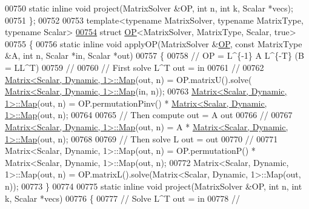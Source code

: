 \begin{DoxyCode}
00750     \textcolor{keyword}{static} \textcolor{keyword}{inline} \textcolor{keywordtype}{void} project(MatrixSolver &OP, \textcolor{keywordtype}{int} n, \textcolor{keywordtype}{int} k, Scalar *vecs);
00751 \};
00752 
00753 \textcolor{keyword}{template}<\textcolor{keyword}{typename} MatrixSolver, \textcolor{keyword}{typename} MatrixType, \textcolor{keyword}{typename} Scalar>
\hyperlink{struct_eigen_1_1internal_1_1_o_p_3_01_matrix_solver_00_01_matrix_type_00_01_scalar_00_01true_01_4}{00754} \textcolor{keyword}{struct }\hyperlink{struct_eigen_1_1internal_1_1_o_p}{OP}<MatrixSolver, MatrixType, Scalar, true>
00755 \{
00756   \textcolor{keyword}{static} \textcolor{keyword}{inline} \textcolor{keywordtype}{void} applyOP(MatrixSolver &\hyperlink{struct_eigen_1_1internal_1_1_o_p}{OP}, \textcolor{keyword}{const} MatrixType &A, \textcolor{keywordtype}{int} n, Scalar *in, Scalar *out)
00757 \{
00758     \textcolor{comment}{// OP = L^\{-1\} A L^\{-T\}  (B = LL^T)}
00759     \textcolor{comment}{//}
00760     \textcolor{comment}{// First solve L^T out = in}
00761     \textcolor{comment}{//}
00762     \hyperlink{group___core___module_class_eigen_1_1_matrix}{Matrix<Scalar, Dynamic, 1>::Map}(out, n) = OP.matrixU().solve(
      \hyperlink{group___core___module_class_eigen_1_1_matrix}{Matrix<Scalar, Dynamic, 1>::Map}(in, n));
00763     \hyperlink{group___core___module_class_eigen_1_1_matrix}{Matrix<Scalar, Dynamic, 1>::Map}(out, n) = OP.permutationPinv() * 
      \hyperlink{group___core___module_class_eigen_1_1_matrix}{Matrix<Scalar, Dynamic, 1>::Map}(out, n);
00764 
00765     \textcolor{comment}{// Then compute out = A out}
00766     \textcolor{comment}{//}
00767     \hyperlink{group___core___module_class_eigen_1_1_matrix}{Matrix<Scalar, Dynamic, 1>::Map}(out, n) = A * 
      \hyperlink{group___core___module_class_eigen_1_1_matrix}{Matrix<Scalar, Dynamic, 1>::Map}(out, n);
00768 
00769     \textcolor{comment}{// Then solve L out = out}
00770     \textcolor{comment}{//}
00771     Matrix<Scalar, Dynamic, 1>::Map(out, n) = OP.permutationP() * Matrix<Scalar, Dynamic, 1>::Map(out, n);
00772     Matrix<Scalar, Dynamic, 1>::Map(out, n) = OP.matrixL().solve(Matrix<Scalar, Dynamic, 1>::Map(out, n));
00773 \}
00774 
00775   \textcolor{keyword}{static} \textcolor{keyword}{inline} \textcolor{keywordtype}{void} project(MatrixSolver &OP, \textcolor{keywordtype}{int} n, \textcolor{keywordtype}{int} k, Scalar *vecs)
00776 \{
00777     \textcolor{comment}{// Solve L^T out = in}
00778     \textcolor{comment}{//}

\end{DoxyCode}
